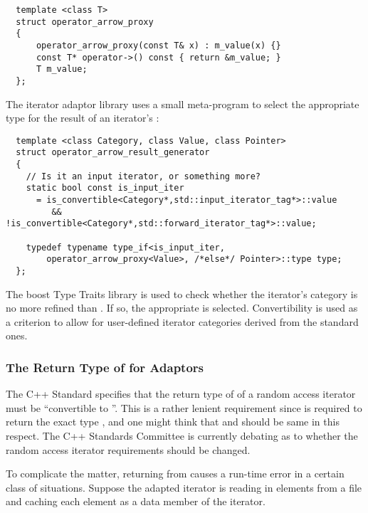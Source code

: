 \documentclass{netobjectdays}
\begin{document}
{\footnotesize
\begin{verbatim}
  template <class T>
  struct operator_arrow_proxy
  {
      operator_arrow_proxy(const T& x) : m_value(x) {}
      const T* operator->() const { return &m_value; }
      T m_value;
  };
\end{verbatim}
}

The iterator adaptor library uses a small meta-program to select the
appropriate type for the result of an iterator's :

{\footnotesize
\begin{verbatim}
  template <class Category, class Value, class Pointer>
  struct operator_arrow_result_generator
  {
    // Is it an input iterator, or something more?
    static bool const is_input_iter
      = is_convertible<Category*,std::input_iterator_tag*>::value
         && !is_convertible<Category*,std::forward_iterator_tag*>::value;

    typedef typename type_if<is_input_iter,
        operator_arrow_proxy<Value>, /*else*/ Pointer>::type type;
  };
\end{verbatim}
}

The boost Type Traits library is used to check whether the iterator's
category is no more refined than . If so,
the appropriate  is selected.
Convertibility is used as a criterion to allow for user-defined
iterator categories derived from the standard ones.

\subsubsection{The Return Type of  for Adaptors}

The C++ Standard specifies that the return type of 
of a random access iterator must be ``convertible to ''.  This
is a rather lenient requirement since  is required to
return the exact type , and one might think that
 and  should be same in this respect.
The C++ Standards Committee is currently debating as to whether the
random access iterator requirements should be changed.

To complicate the matter, returning  from 
causes a run-time error in a certain class of situations.  Suppose the
adapted iterator is reading in elements from a file and caching each
element as a data member of the iterator.  
\end{document}
